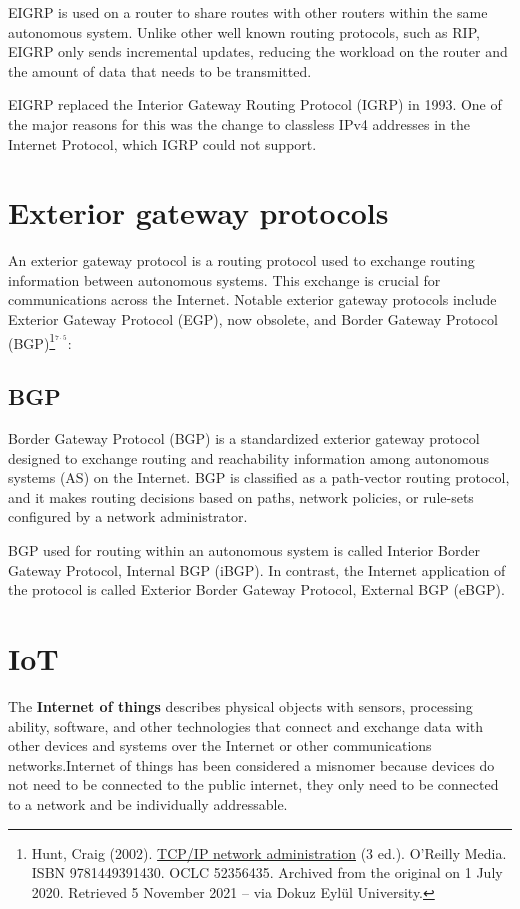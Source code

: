 \documentclass[a4paper,12pt]{article}
\begin{document}
EIGRP is used on a router to share routes with other routers within the same autonomous system. Unlike other well known routing protocols, such as RIP, EIGRP only sends incremental updates, reducing the workload on the router and the amount of data that needs to be transmitted.

EIGRP replaced the Interior Gateway Routing Protocol (IGRP) in 1993. One of the major reasons for this was the change to classless IPv4 addresses in the Internet Protocol, which IGRP could not support.

\section{Exterior gateway protocols}

An exterior gateway protocol is a routing protocol used to exchange routing information between autonomous systems. This exchange is crucial for communications across the Internet. Notable exterior gateway protocols include Exterior Gateway Protocol (EGP), now obsolete, and Border Gateway Protocol (BGP)\footnote{\label{EGP}  Hunt, Craig (2002). \href{http://web.deu.edu.tr/doc/oreily/networking/tcpip/index.htm}{TCP/IP network administration} (3 ed.). O'Reilly Media. ISBN 9781449391430. OCLC 52356435. Archived from the original on 1 July 2020. Retrieved 5 November 2021 – via Dokuz Eylül University.}${}^{{}^{7 \cdot 5}}$:  

\subsection{BGP}
Border Gateway Protocol (BGP) is a standardized exterior gateway protocol designed to exchange routing and reachability information among autonomous systems (AS) on the Internet. BGP is classified as a path-vector routing protocol, and it makes routing decisions based on paths, network policies, or rule-sets configured by a network administrator.

BGP used for routing within an autonomous system is called Interior Border Gateway Protocol, Internal BGP (iBGP). In contrast, the Internet application of the protocol is called Exterior Border Gateway Protocol, External BGP (eBGP).

\section{IoT}
The \textbf{Internet of things} describes physical objects with sensors, processing ability, software, and other technologies that connect and exchange data with other devices and systems over the Internet or other communications networks.Internet of things has been considered a misnomer because devices do not need to be connected to the public internet, they only need to be connected to a network and be individually addressable.
\end{document}
